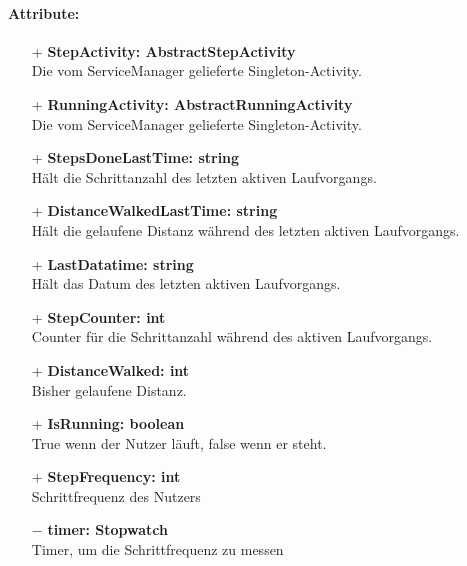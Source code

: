 \documentclass[a4paper,12pt]{article}
\begin{document}
\paragraph{Attribute:}
\begin{itemize}
	\item[+] \textbf{StepActivity: AbstractStepActivity} \\ Die vom ServiceManager gelieferte Singleton-Activity.
	\item[+] \textbf{RunningActivity: AbstractRunningActivity} \\ Die vom ServiceManager gelieferte Singleton-Activity.
	\item[+] \textbf{StepsDoneLastTime: string} \\ Hält die Schrittanzahl des letzten aktiven Laufvorgangs. 
	\item[+] \textbf{DistanceWalkedLastTime: string} \\ Hält die gelaufene Distanz während des letzten aktiven Laufvorgangs. 
	\item[+] \textbf{LastDatatime: string} \\ Hält das Datum des letzten aktiven Laufvorgangs. 
	\item[+] \textbf{StepCounter: int} \\ Counter für die Schrittanzahl während des aktiven Laufvorgangs. 
	\item[+] \textbf{DistanceWalked: int} \\  Bisher gelaufene Distanz. 
	\item[+] \textbf{IsRunning: boolean} \\ True wenn der Nutzer läuft, false wenn er steht. 
	\item[+] \textbf{StepFrequency: int} \\ Schrittfrequenz des Nutzers
	\item[$-$] \textbf{timer: Stopwatch} \\ Timer, um die Schrittfrequenz zu messen

\end{itemize}
\end{document}

